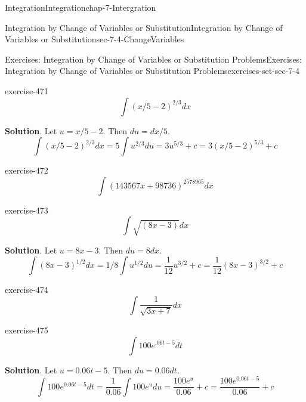 \documentclass[oneside,10pt,]{book}
\numberwithin{equation}{section}
\begin{document}
\begin{chapterptx}{Integration}{}{Integration}{}{}{chap-7-Intergration}
\begin{sectionptx}{Integration by Change of Variables or Substitution}{}{Integration by Change of Variables or Substitution}{}{}{sec-7-4-ChangeVariables}
\begin{exercises-subsection-numberless}{Exercises: Integration by Change of Variables or Substitution Problems}{}{Exercises: Integration by Change of Variables or Substitution Problems}{}{}{exercises-set-sec-7-4}
\begin{divisionexercise}{3}{}{}{exercise-471}%
%
\begin{equation*}
\int (x/5-2)^{2/3}  dx
\end{equation*}
\par\smallskip%
\noindent\textbf{Solution}.\hypertarget{solution-239}{}\quad%
\hypertarget{p-2857}{}%
Let \(u=x/5-2\).  Then \(du=dx/5\).%
%
\begin{equation*}
\int (x/5-2)^{2/3}  dx=5\int {u^{2/3}  du}=3{u^{5/3}}+c
=3{(x/5-2)^{5/3}} +c
\end{equation*}
\end{divisionexercise}%
\begin{divisionexercise}{4}{}{}{exercise-472}%
%
\begin{equation*}
\int (143567x+98736)^{2578965}  dx 
\end{equation*}
\end{divisionexercise}%
\begin{divisionexercise}{5}{}{}{exercise-473}%
%
\begin{equation*}
\int \sqrt{(8x-3)}  dx
\end{equation*}
\par\smallskip%
\noindent\textbf{Solution}.\hypertarget{solution-240}{}\quad%
\hypertarget{p-2858}{}%
Let \(u=8x-3\).  Then \(du=8dx\).%
%
\begin{equation*}
\int (8x-3)^{1/2}  dx=1/8 \int {u^{1/2}  du}=\frac{1}{12}{u^{3/2}}+c
=\frac{1}{12}{(8x-3)^{3/2}} +c
\end{equation*}
\end{divisionexercise}%
\begin{divisionexercise}{6}{}{}{exercise-474}%
%
\begin{equation*}
\int \frac{1}{\sqrt{3x+7}}  dx 
\end{equation*}
\end{divisionexercise}%
\begin{divisionexercise}{7}{}{}{exercise-475}%
%
\begin{equation*}
\int 100e^{.06t-5}  dt
\end{equation*}
\par\smallskip%
\noindent\textbf{Solution}.\hypertarget{solution-241}{}\quad%
\hypertarget{p-2859}{}%
Let \(u=0.06t-5\).  Then \(du=0.06dt\).%
%
\begin{equation*}
\int 100 e^{0.06t-5}dt
=\frac{1}{0.06} \int {100 e^{u}du}=\frac{100 e^{u}}{0.06}+c
=\frac{100 e^{0.06t-5}}{0.06}+c
\end{equation*}
\end{divisionexercise}%

\end{exercises-subsection-numberless}
\end{sectionptx}
\end{chapterptx}
\end{document}
